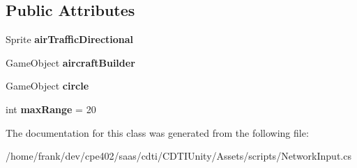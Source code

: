 \subsection*{Public Attributes}
\begin{DoxyCompactItemize}
\item 
\hypertarget{class_network_input_a645c85b706841b9efd9be62cecff9e37}{}Sprite {\bfseries air\+Traffic\+Directional}\label{class_network_input_a645c85b706841b9efd9be62cecff9e37}

\item 
\hypertarget{class_network_input_a4cbaddf7224566f6a01d23a1788b723d}{}Game\+Object {\bfseries aircraft\+Builder}\label{class_network_input_a4cbaddf7224566f6a01d23a1788b723d}

\item 
\hypertarget{class_network_input_a8465b038857f973c9a8b7513ead2b563}{}Game\+Object {\bfseries circle}\label{class_network_input_a8465b038857f973c9a8b7513ead2b563}

\item 
\hypertarget{class_network_input_a3b50fccf39e33592acc615ab7f70abe8}{}int {\bfseries max\+Range} = 20\label{class_network_input_a3b50fccf39e33592acc615ab7f70abe8}

\end{DoxyCompactItemize}


The documentation for this class was generated from the following file\+:\begin{DoxyCompactItemize}
\item 
/home/frank/dev/cpe402/saas/cdti/\+C\+D\+T\+I\+Unity/\+Assets/scripts/Network\+Input.\+cs\end{DoxyCompactItemize}
